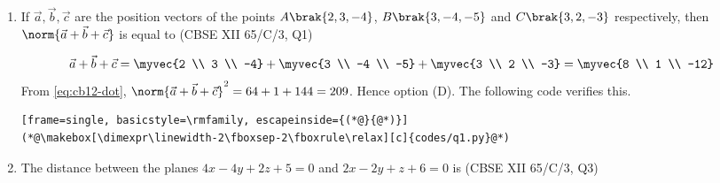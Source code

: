 \begin{enumerate}[label=\thesubsection.\arabic*, ref=\thesubsection.\theenumi,itemsep=0pt]

\item If $\vec{a}, \vec{b}, \vec{c}$ are the position vectors of the points $A\brak{2,3,-4}$, $B\brak{3,-4,-5}$ and $C\brak{3,2,-3}$ respectively, then $\norm{\vec{a}+\vec{b}+\vec{c}}$ is equal to
\hfill (CBSE XII 65/C/3, Q1)
\begin{enumerate}[itemsep=0pt]
\end{enumerate}

\solution
\begin{align}
\vec{a}+\vec{b}+\vec{c} = \myvec{2 \\ 3 \\ -4} + \myvec{3 \\ -4 \\ -5} + \myvec{3 \\ 2 \\ -3} = \myvec{8 \\ 1 \\ -12}
\end{align}
From \eqref{eq:cb12-dot}, $\norm{\vec{a}+\vec{b}+\vec{c}}^2 = 64 + 1 + 144 = 209$. Hence option (D). The following code verifies this.
\begin{lstlisting}[frame=single, basicstyle=\rmfamily, escapeinside={(*@}{@*)}]
(*@\makebox[\dimexpr\linewidth-2\fboxsep-2\fboxrule\relax][c]{codes/q1.py}@*)
\end{lstlisting}

\item The distance between the planes $4x - 4y + 2z + 5 = 0$ and $2x - 2y + z + 6 = 0$ is
\hfill (CBSE XII 65/C/3, Q3)
\begin{enumerate}[itemsep=0pt]
\end{enumerate}


\end{enumerate}
